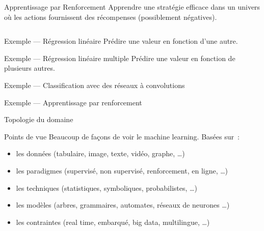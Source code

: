 \begin{frame}{Apprentissage par Renforcement}
  Apprendre une stratégie efficace dans un univers où les actions fournissent des récompenses (possiblement négatives).
  \vfill
  \begin{columns}[T]
    \begin{column}{0.5\textwidth}
    \end{column}
    \begin{column}{0.5\textwidth}
    \end{column}
  \end{columns}
\end{frame}

\begin{frame}{Exemple --- Régression linéaire}
  Prédire une valeur en fonction d'une autre.

\end{frame}

\begin{frame}{Exemple --- Régression linéaire multiple}
  Prédire une valeur en fonction de plusieurs autres.

\end{frame}

\begin{frame}{Exemple --- Classification avec des réseaux à convolutions}
\end{frame}

\begin{frame}{Exemple --- Apprentissage par renforcement}
\end{frame}

\begin{frame}{Topologie du domaine}
\end{frame}

\begin{frame}{Points de vue}
  Beaucoup de façons de voir le machine learning. Basées sur~:
  \begin{itemize}[<+->]
    \item les données (tabulaire, image, texte, vidéo, graphe, …)
    \item les paradigmes (supervisé, non supervisé, renforcement, en
      ligne, …)
    \item les techniques (statistiques, symboliques, probabilistes, …)
    \item les modèles (arbres, grammaires, automates, réseaux de
      neurones …)
    \item les contraintes (real time, embarqué, big data, multilingue,
      …)
  \end{itemize}
\end{frame}


